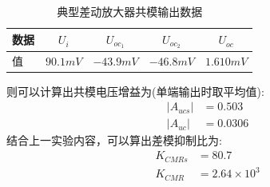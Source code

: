 \documentclass[a4paper,11pt,UTF8]{ctexart}
\begin{document}
\begin{table}[!h!tbp]
  \caption{典型差动放大器共模输出数据}\label{tab:ncTab}
    \centering
    \begin{tabular}{|l|c|c|c|c|}
    \hline
    数据 &$U_{i}$&$U_{oc_1}$&$U_{oc_2}$&$U_{oc}$         \\ \hline
    值   &$90.1mV$&$-43.9mV$&$-46.8mV$&$1.610mV$     \\ \hline
  \end{tabular}
  \end{table}
则可以计算出共模电压增益为(单端输出时取平均值):
\begin{equation}
  \begin{aligned}
    \left | A_{ucs}\right |&=0.503\\
    \left | A_{uc}\right |&=0.0306
  \end{aligned}
\end{equation}
结合上一实验内容，可以算出差模抑制比为:
\begin{equation}
  \begin{aligned}
    K_{CMRs}&=80.7\\
    K_{CMR}&=2.64\times10^{3}
  \end{aligned}
\end{equation}
\end{document}
